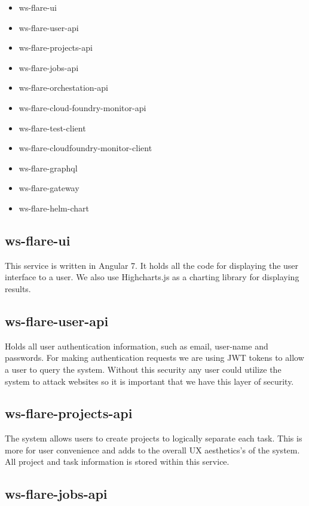 \begin{itemize}
  \item ws-flare-ui
  \item ws-flare-user-api
  \item ws-flare-projects-api
  \item ws-flare-jobs-api
  \item ws-flare-orchestation-api
  \item ws-flare-cloud-foundry-monitor-api
  \item ws-flare-test-client
  \item ws-flare-cloudfoundry-monitor-client
  \item ws-flare-graphql
  \item ws-flare-gateway
  \item ws-flare-helm-chart
\end{itemize}

\subsection{ws-flare-ui}

This service is written in Angular 7. It holds all the code for displaying the user interface to a user. We also use Highcharts.js as a charting library for displaying results.

\subsection{ws-flare-user-api}

Holds all user authentication information, such as email, user-name and passwords. For making authentication requests we are using JWT tokens to allow a user to query the system. Without this security any user could utilize the system to attack websites so it is important that we have this layer of security.

\subsection{ws-flare-projects-api}

The system allows users to create projects to logically separate each task. This is more for user convenience and adds to the overall UX aesthetics's of the system. All project and task information is stored within this service. 

\subsection{ws-flare-jobs-api}

